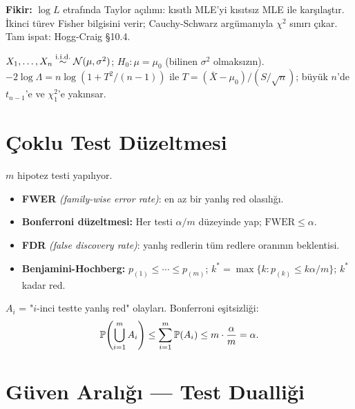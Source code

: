 \begin{ispatiskele}
\textbf{Fikir:} $\log L$ etrafında Taylor açılımı: kısıtlı MLE'yi kısıtsız MLE ile karşılaştır. İkinci türev Fisher bilgisini verir; Cauchy-Schwarz argümanıyla $\chi^2$ sınırı çıkar. Tam ispat: Hogg-Craig §10.4.
\end{ispatiskele}

\begin{ornek}\label{ex:ort_normal}
$X_1,\ldots,X_n\overset{\text{i.i.d.}}{\sim}\mathcal{N}(\mu,\sigma^2)$; $H_0:\mu=\mu_0$ (bilinen $\sigma^2$ olmaksızın). $-2\log\Lambda=n\log(1+T^2/(n-1))$ ile $T=(\bar{X}-\mu_0)/(S/\sqrt{n})$; büyük $n$'de $t_{n-1}$'e ve $\chi^2_1$'e yakınsar.
\end{ornek}

\section{Çoklu Test Düzeltmesi}
\label{sec:coklu_test}

\begin{tanim}\label{def:coklu_hata}
$m$ hipotez testi yapılıyor.
\begin{itemize}
  \item \textbf{FWER} \emph{(family-wise error rate)}: en az bir yanlış red olasılığı.
  \item \textbf{Bonferroni düzeltmesi:} Her testi $\alpha/m$ düzeyinde yap; $\mathrm{FWER}\leq\alpha$.
  \item \textbf{FDR} \emph{(false discovery rate)}: yanlış redlerin tüm redlere oranının beklentisi.
  \item \textbf{Benjamini-Hochberg:} $p_{(1)}\leq\cdots\leq p_{(m)}$; $k^*=\max\{k:p_{(k)}\leq k\alpha/m\}$; $k^*$ kadar red.
\end{itemize}
\end{tanim}

\begin{teorem}\label{thm:bonferroni}
$A_i$ = "$i$-inci testte yanlış red" olayları. Bonferroni eşitsizliği:
\[
  \mathbb{P}\!\left(\bigcup_{i=1}^m A_i\right) \leq \sum_{i=1}^m \mathbb{P}(A_i) \leq m\cdot\frac{\alpha}{m} = \alpha.
\]
\end{teorem}

\section{Güven Aralığı --- Test Dualliği}
\label{sec:ga_test_dual}

